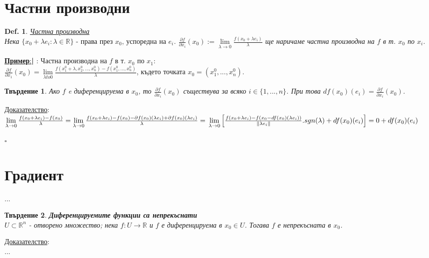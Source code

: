 \documentclass[12pt]{article}
\newcommand{\halfbox}[1]{\underline{\textbf{#1}:}\textbf{\large{| }}}
\newtheorem{proposition}{Твърдение}
\newtheorem{definition}{Def.}
\begin{document}
	\section*{Частни производни}
	\begin{definition}
		\underline{Частна производна}\\
		Нека $\{x_0 + \lambda e_i : \lambda \in \mathbb{R}\}\text{ - права през }x_0\text{, успоредна на }e_i$. 
		$\frac{\partial f}{\partial x_i}(x_0) := \lim\limits_{\lambda\to0}\frac{f(x_0+\lambda e_i)}{\lambda}$ ще наричаме частна производна на $f$ в т. $x_0$ по $x_i$.
	\end{definition}
	\halfbox{Пример}: Частна производна на $f$ в т. $x_0$ по $x_1$:\\
	$\frac{\partial f}{\partial x_1}(x_0) = \lim\limits_{\lambda to 0}\frac{f(x_1^0+\lambda, x_2^0, ..., x_n^0)-f(x_1^0, ..., x_n^0)}{\lambda}$, където точката $x_0 = (x_1^0, ..., x_n^0)$.
	
	\begin{proposition}
		Ако $f$ e диференцируема в $x_0$, то $\frac{\partial f}{\partial x_i}(x_0)$ съществува за всяко $i\in\{1,...,n\}$. При това $df(x_0)(e_i)=\frac{\partial f}{\partial x_i}(x_0)$.
	\end{proposition}
	\underline{Доказателство}:\\
	\begin{math}
		\lim\limits_{\lambda\to0}\frac{f(x_0+\lambda e_i)-f(x_0)}{\lambda} = \lim\limits_{\lambda\to0}\frac{f(x_0+\lambda e_i)-f(x_0)-\partial f(x_0)(\lambda e_i)+\partial f(x_0)(\lambda e_i)}{\lambda} = \\
		\lim\limits_{\lambda\to 0}\left[\frac{f(x_0+\lambda e_i) - f(x_0 - df(x_0)(\lambda e_i))}{\|\lambda e_i\|}.sgn(\lambda) + df(x_0)(e_i)\right] =
		0 + df(x_0)(e_i)
	\end{math} \begin{flushright}
		$\square$
	\end{flushright}
	
	
	
	\section*{Градиент}
	...\\
	\begin{proposition} \textbf{Диференцируемите функции са непрекъснати}\\
		$U\subset\mathbb{R}^n$ - отворено множество; нека $f:U\rightarrow\mathbb{R}$ и $f$ е диференцируема в $x_0\in U$. Тогава $f$ е непрекъсната в $x_0$.
	\end{proposition}
	\underline{Доказателство}:\\
	...
	
\end{document}
